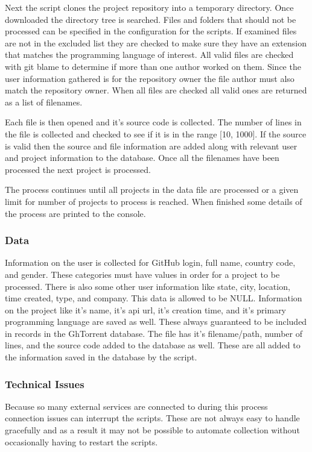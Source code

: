 \documentclass{article}
\begin{document}
Next the script clones the project repository into a temporary directory. Once downloaded the directory tree is searched. Files and folders that should not be processed can be specified in the configuration for the scripts. If examined files are not in the excluded list they are checked to make sure they have an extension that matches the programming language of interest. All valid files are checked with git blame to determine if more than one author worked on them. Since the user information gathered is for the repository owner the file author must also match the repository owner. When all files are checked all valid ones are returned as a list of filenames.

Each file is then opened and it's source code is collected. The number of lines in the file is collected and checked to see if it is in the range [10, 1000]. If the source is valid then the source and file information are added along with relevant user and project information to the database. Once all the filenames have been processed the next project is processed.

The process continues until all projects in the data file are processed or a given limit for number of projects to process is reached. When finished some details of the process are printed to the console.

\subsubsection*{Data}
Information on the user is collected for GitHub login, full name, country code, and gender. These categories must have values in order for a project to be processed. There is also some other user information like state, city, location, time created, type, and company. This data is allowed to be NULL. Information on the project like it's name, it's api url, it's creation time, and it's primary programming language are saved as well. These always guaranteed to be included in records in the GhTorrent database. The file has it's filename/path, number of lines, and the source code added to the database as well. These are all added to the information saved in the database by the script.

\subsubsection*{Technical Issues}
Because so many external services are connected to during this process connection issues can interrupt the scripts. These are not always easy to handle gracefully and as a result it may not be possible to automate collection without occasionally having to restart the scripts.
\end{document}
